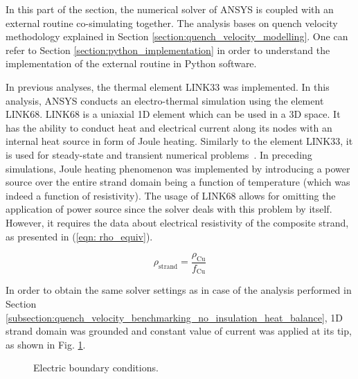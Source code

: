 
In this part of the section, the numerical solver of ANSYS is coupled with an external routine co-simulating together. The analysis bases on quench velocity methodology explained in Section \ref{section:quench_velocity_modelling}. One can refer to Section \ref{section:python_implementation} in order to understand the implementation of the external routine in Python software. 

In previous analyses, the thermal element LINK33 was implemented. In this analysis, ANSYS conducts an electro-thermal simulation using the element LINK68. LINK68 is a uniaxial 1D element which can be used in a 3D space. It has the ability to conduct heat and electrical current along its nodes with an internal heat source in form of Joule heating. Similarly to the element LINK33, it is used for steady-state and transient numerical problems~\cite{ansys_element_manual}. In preceding simulations, Joule heating phenomenon was implemented by introducing a power source over the entire strand domain being a function of temperature (which was indeed a function of resistivity). The usage of LINK68 allows for omitting the application of power source since the solver deals with this problem by itself. However, it requires the data about electrical resistivity of the composite strand, as presented in (\ref{eqn: rho_equiv}).

\begin{equation}
    \rho_\text{strand} = \frac{\rho_\text{Cu}}{f_\text{Cu}}
    \label{eqn: rho_equiv}
\end{equation}

In order to obtain the same solver settings as in case of the analysis performed in Section \ref{subsection:quench_velocity_benchmarking_no_insulation_heat_balance}, 1D strand domain was grounded and constant value of current was applied at its  tip, as shown in Fig. \ref{fig: q_vel_benchmarking_electrical_settings}.

\begin{figure}[H]
\centering
{}
\caption{Electric boundary conditions.}
\label{fig: q_vel_benchmarking_electrical_settings}
\end{figure}


